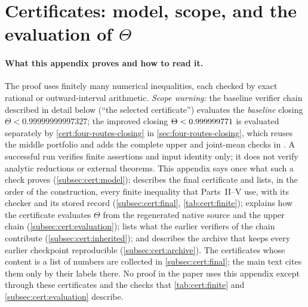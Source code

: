 \providecommand{\PurePairExponent}{\frac{243319543}{22187500000000}}
\providecommand{\ContinuationExponent}{\frac{4066280877}{355000000000000}}
\providecommand{\AdvanceExponent}{\frac{8855891201}{710000000000000}}
\providecommand{\PushA}{\frac{5422587}{6103515625}}
\providecommand{\PushExponent}{\frac{5422587}{433349609375}}
\providecommand{\PushK}{890666}
\providecommand{\PushTheta}{0.99999999997327}

\section{Certificates: model, scope, and the evaluation of \texorpdfstring{$\Theta$}{Theta}}
\label{app:certificates}

\paragraph{What this appendix proves and how to read it.}
The proof uses finitely many numerical inequalities, each checked
by exact rational or outward-interval arithmetic. \emph{Scope
warning:} the baseline verifier chain described in detail below
(``the selected certificate'') evaluates the \emph{baseline} closing
$\Theta<\PushTheta$; the improved closing
$\Theta<0.999999771$ is evaluated separately by
\cref{cert:four-routes-closing} in \cref{sec:four-routes-closing},
which reuses the middle portfolio and adds the complete upper and
joint-mean checks in . A
successful run verifies finite assertions and input identity only;
it does not verify analytic reductions or external theorems. This appendix says once what such a check
proves (\cref{subsec:cert:model}); describes the final certificate and lists,
in the order of the construction, every finite inequality that Parts~II--V use, with
its checker and its stored record (\cref{subsec:cert:final},
\cref{tab:cert:finite}); explains how the certificate evaluates $\Theta$
from the regenerated native source and the upper chain
(\cref{subsec:cert:evaluation}); lists what the earlier verifiers of the
chain contribute (\cref{subsec:cert:inherited}); and describes the archive
that keeps every earlier checkpoint reproducible (\cref{subsec:cert:archive}).
The certificates whose content is a list of numbers are collected in
\cref{subsec:cert:final}; the main text cites them only by their
labels there. No proof in the paper
uses this appendix except through these certificates and the checks that
\cref{tab:cert:finite} and \cref{subsec:cert:evaluation} describe.


